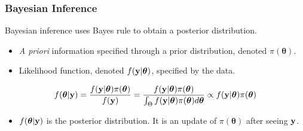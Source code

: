 \documentclass[black]{beamer}
\begin{document}
\begin{frame}
\frametitle{Bayesian Inference}
Bayesian inference uses Bayes rule to obtain a posterior distribution.
\begin{center}
\begin{itemize}
\item {\it A priori} information specified through a prior distribution, denoted $\pi(\boldsymbol\theta)$.
\item Likelihood function, denoted $f({\bf y}|\boldsymbol\theta)$, specified by the data.
\end{itemize}
\[
f(\boldsymbol\theta|{\bf y}) = \frac{f({\bf y}| \boldsymbol\theta)\pi(\boldsymbol\theta)}{f({\bf y})} = \frac{f({\bf y}| \boldsymbol\theta)\pi(\boldsymbol\theta)}{\int_\Theta f({\bf y}|\boldsymbol\theta)\pi(\boldsymbol\theta)d\boldsymbol\theta} \propto f({\bf y}| \boldsymbol\theta)\pi(\boldsymbol\theta)
\]
\end{center}
\begin{itemize}
\item $f(\boldsymbol\theta|{\bf y})$ is the posterior distribution.  It is an update of $\pi(\boldsymbol\theta)$ after seeing ${\bf y}$.
\end{itemize}
\end{frame}
\end{document}
